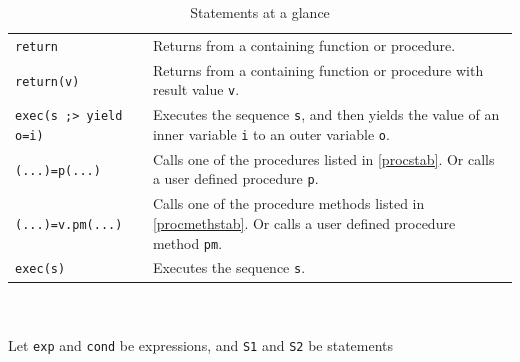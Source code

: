 \begin{table}[htbp]
\begin{minipage}{\linewidth}
\begin{tabularx}{\linewidth}{|lX|}
\texttt{return} & Returns from a containing function or procedure.\\
\texttt{return(v)} & Returns from a containing function or procedure with result value \texttt{v}.\\
\hline
\texttt{exec(s ;> yield o=i)} & Executes the sequence \texttt{s}, and then yields the value of an inner variable \texttt{i} to an outer variable \texttt{o}.\\
\hline
\texttt{(...)=p(...)}	& Calls one of the procedures listed in \ref{procstab}. Or calls a user defined procedure \texttt{p}.\\
\texttt{(...)=v.pm(...)}	& Calls one of the procedure methods listed in \ref{procmethstab}. Or calls a user defined procedure method \texttt{pm}.\\
\hline
\texttt{exec(s)} & Executes the sequence \texttt{s}.\\
\hline
\end{tabularx}
\end{minipage}\\
\\ 
{\small Let \texttt{exp} and \texttt{cond} be expressions, and \texttt{S1} and \texttt{S2} be statements}
\caption{Statements at a glance}
\label{statementstab}
\end{table}



